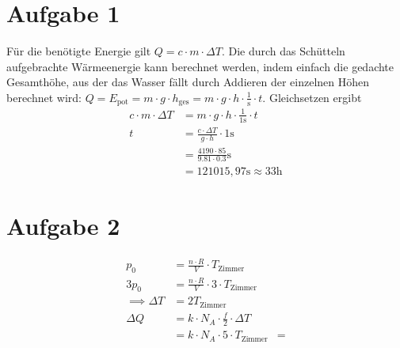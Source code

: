 \documentclass{article}
\begin{document}
    \section*{Aufgabe 1}
    Für die benötigte Energie gilt $Q = c \cdot m \cdot \Delta T$. Die durch das Schütteln aufgebrachte Wärmeenergie kann berechnet werden, indem einfach die gedachte Gesamthöhe, aus der das Wasser fällt durch Addieren der einzelnen Höhen berechnet wird: $Q = E_{\text{pot}} = m \cdot g \cdot h_\text{ges} = m \cdot g \cdot h \cdot \frac{1}{\mathrm{s}} \cdot t$. Gleichsetzen ergibt
    \begin{align*}
        c \cdot m \cdot \Delta T &= m \cdot g \cdot h \cdot \frac{1}{1\mathrm{s}} \cdot t\\
        t &= \frac{c \cdot \Delta T}{g \cdot h} \cdot 1\mathrm{s}\\
        &= \frac{4190 \cdot 85}{9.81 \cdot 0.3}\mathrm{s}\\
        &= 121015,97 \mathrm{s} \approx 33 \mathrm{h}
    \end{align*}
    \section*{Aufgabe 2}
    \begin{align*}
        p_0 &= \frac{n \cdot R}{V}\cdot T_\text{Zimmer}\\
        3p_0 &= \frac{n \cdot R}{V}\cdot 3 \cdot T_\text{Zimmer}\\
        \implies \Delta T &= 2 T_\text{Zimmer}\\
        \Delta Q &= k \cdot N_A \cdot \frac{f}{2} \cdot \Delta T\\
        &= k \cdot N_A \cdot 5 \cdot T_\text{Zimmer}
        &= 
    \end{align*}
\end{document}
